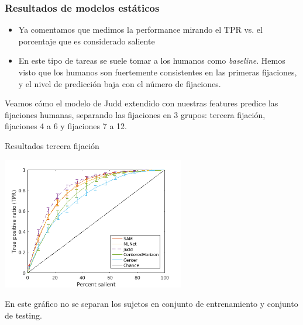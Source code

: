 \documentclass[compress]{beamer}
\begin{document}


\subsubsection{Resultados de modelos estáticos}
\begin{frame}
\begin{itemize}
\item Ya comentamos que medimos la performance mirando el TPR vs. el porcentaje que es considerado saliente
\item En este tipo de tareas se suele tomar a los humanos como \textit{baseline}. Hemos visto que los humanos son fuertemente consistentes en las primeras fijaciones, y el nivel de predicción baja con el número de fijaciones.
\end{itemize}

\bigskip
Veamos cómo el modelo de Judd extendido con nuestras features predice las fijaciones humanas, separando las fijaciones en 3 grupos: tercera fijación, fijaciones 4 a 6 y fijaciones 7 a 12.

\end{frame}

\begin{frame}{Resultados tercera fijación}
\begin{center}
\includegraphics[width=0.6\textwidth]{images/results_fix_3_to_3_all.png} 
\end{center}

{\footnotesize En este gráfico no se separan los sujetos en conjunto de entrenamiento y conjunto de testing. }
\end{frame}
\end{document}
